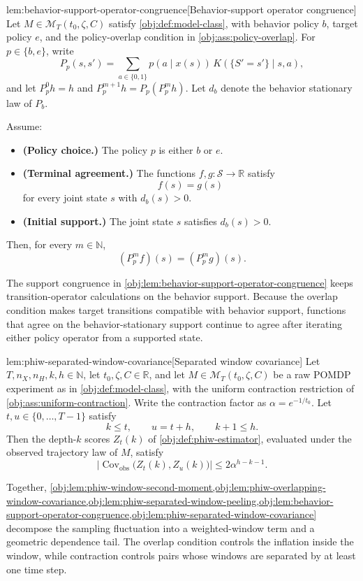\begin{lemmav}{lem:behavior-support-operator-congruence}[Behavior-support operator congruence]
Let \(M\in\mathcal M_T(t_0,\zeta,C)\) satisfy \cref{obj:def:model-class}, with behavior policy \(b\), target policy \(e\), and the policy-overlap condition in \cref{obj:ass:policy-overlap}.  For \(p\in\{b,e\}\), write
\[
P_p(s,s')=\sum_{a\in\{0,1\}} p(a\mid x(s))\,K(\{S'=s'\}\mid s,a),
\]
and let \(P_p^0 h=h\) and \(P_p^{m+1}h=P_p(P_p^m h)\).  Let \(d_b\) denote the behavior stationary law of \(P_b\).

Assume:
\begin{itemize}
\item \textbf{(Policy choice.)} The policy \(p\) is either \(b\) or \(e\).
\item \textbf{(Terminal agreement.)} The functions \(f,g:\mathcal S\to\mathbb R\) satisfy
\[
f(s)=g(s)
\]
for every joint state \(s\) with \(d_b(s)>0\).
\item \textbf{(Initial support.)} The joint state \(s\) satisfies \(d_b(s)>0\).
\end{itemize}
Then, for every \(m\in\mathbb N\),
\[
(P_p^m f)(s)=(P_p^m g)(s).
\]
\end{lemmav}

The support congruence in \cref{obj:lem:behavior-support-operator-congruence} keeps transition-operator calculations on the behavior support. Because the overlap condition makes target transitions compatible with behavior support, functions that agree on the behavior-stationary support continue to agree after iterating either policy operator from a supported state.

\begin{lemmav}{lem:phiw-separated-window-covariance}[Separated window covariance]
Let \(T,n_X,n_H,k,h\in\mathbb N\), let \(t_0,\zeta,C\in\mathbb R\), and let \(M\in\mathcal M_T(t_0,\zeta,C)\) be a raw POMDP experiment as in \cref{obj:def:model-class}, with the uniform contraction restriction of \cref{obj:ass:uniform-contraction}. Write the contraction factor as \(\alpha=e^{-1/t_0}\). Let \(t,u\in\{0,\ldots,T-1\}\) satisfy
\[
k\le t,\qquad u=t+h,\qquad k+1\le h .
\]
Then the depth-\(k\) scores \(Z_t(k)\) of \cref{obj:def:phiw-estimator}, evaluated under the observed trajectory law of \(M\), satisfy
\[
\bigl|\operatorname{Cov}_{\mathrm{obs}}\bigl(Z_t(k),Z_u(k)\bigr)\bigr|
\le
2\alpha^{h-k-1}.
\]
\end{lemmav}

Together, \cref{obj:lem:phiw-window-second-moment,obj:lem:phiw-overlapping-window-covariance,obj:lem:phiw-separated-window-peeling,obj:lem:behavior-support-operator-congruence,obj:lem:phiw-separated-window-covariance} decompose the sampling fluctuation into a weighted-window term and a geometric dependence tail. The overlap condition controls the inflation inside the window, while contraction controls pairs whose windows are separated by at least one time step.


